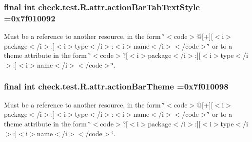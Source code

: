 \subsubsection[{action\+Bar\+Tab\+Text\+Style}]{\setlength{\rightskip}{0pt plus 5cm}final int check.\+test.\+R.\+attr.\+action\+Bar\+Tab\+Text\+Style =0x7f010092\hspace{0.3cm}{\ttfamily [static]}}\label{classcheck_1_1test_1_1_r_1_1attr_aff28ad7140f8babb08a120b09cb32cc9}
Must be a reference to another resource, in the form \char`\"{}$<$code$>$@\mbox{[}+\mbox{]}\mbox{[}$<$i$>$package$<$/i$>$\+:\mbox{]}$<$i$>$type$<$/i$>$\+:$<$i$>$name$<$/i$>$$<$/code$>$\char`\"{} or to a theme attribute in the form \char`\"{}$<$code$>$?\mbox{[}$<$i$>$package$<$/i$>$\+:\mbox{]}\mbox{[}$<$i$>$type$<$/i$>$\+:\mbox{]}$<$i$>$name$<$/i$>$$<$/code$>$\char`\"{}. \hypertarget{classcheck_1_1test_1_1_r_1_1attr_ae4102aa166097ebb0e9d11c82b2ad401}{}
\subsubsection[{action\+Bar\+Theme}]{\setlength{\rightskip}{0pt plus 5cm}final int check.\+test.\+R.\+attr.\+action\+Bar\+Theme =0x7f010098\hspace{0.3cm}{\ttfamily [static]}}\label{classcheck_1_1test_1_1_r_1_1attr_ae4102aa166097ebb0e9d11c82b2ad401}
Must be a reference to another resource, in the form \char`\"{}$<$code$>$@\mbox{[}+\mbox{]}\mbox{[}$<$i$>$package$<$/i$>$\+:\mbox{]}$<$i$>$type$<$/i$>$\+:$<$i$>$name$<$/i$>$$<$/code$>$\char`\"{} or to a theme attribute in the form \char`\"{}$<$code$>$?\mbox{[}$<$i$>$package$<$/i$>$\+:\mbox{]}\mbox{[}$<$i$>$type$<$/i$>$\+:\mbox{]}$<$i$>$name$<$/i$>$$<$/code$>$\char`\"{}. \hypertarget{classcheck_1_1test_1_1_r_1_1attr_abfe49028f89a795ded936ee9dc2a850b}{}
